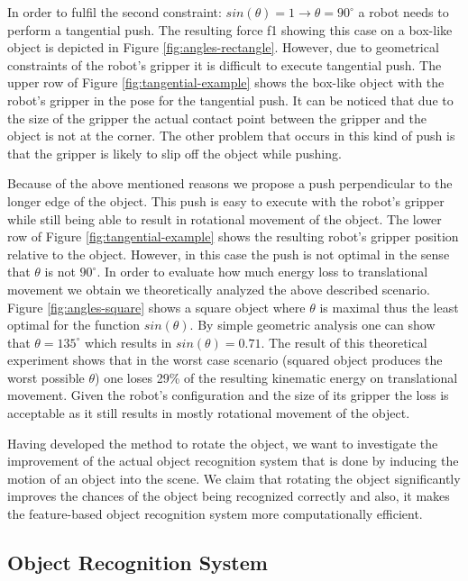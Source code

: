 In order to fulfil the second constraint: $sin(\theta) = 1 \to \theta = 90 ^\circ$ a robot needs to perform a tangential push. The resulting force f1 showing this case on a box-like object is depicted in Figure \ref{fig:angles-rectangle}. However, due to geometrical constraints of the robot's gripper it is difficult to execute tangential push. The upper row of Figure \ref{fig:tangential-example} shows the box-like object with the robot's gripper in the pose for the tangential push. It can be noticed that due to the size of the gripper the actual contact point between the gripper and the object is not at the corner. The other problem that occurs in this kind of push is that the gripper is likely to slip off the object while pushing.

Because of the above mentioned reasons we propose a push perpendicular to the longer edge of the object. This push is easy to execute with the robot's gripper while still being able to result in rotational movement of the object. The lower row of Figure \ref{fig:tangential-example} shows the resulting robot's gripper position relative to the object. However, in this case the push is not optimal in the sense that $\theta$ is not $90 ^\circ$. In order to evaluate how much energy loss to translational movement we obtain we theoretically analyzed the above described scenario. Figure \ref{fig:angles-square} shows a square object where $\theta$ is maximal thus the least optimal for the function $sin(\theta)$. By simple geometric analysis one can show that $\theta =135 ^\circ$ which results in $sin(\theta) = 0.71$. The result of this theoretical experiment shows that in the worst case scenario (squared object produces the worst possible $\theta$) one loses 29\% of the resulting kinematic energy on translational movement. Given the robot's configuration and the size of its gripper the loss is acceptable as it still results in mostly rotational movement of the object. 

Having developed the method to rotate the object, we want to investigate the improvement of the actual object recognition system that is done by inducing the motion of an object into the scene. We claim that rotating the object significantly improves the chances of the object being recognized correctly and also, it makes the feature-based object recognition system more computationally efficient.

\subsection{Object Recognition System}

